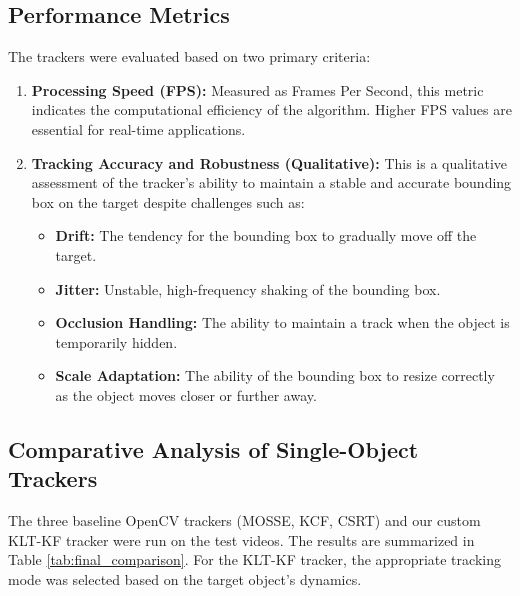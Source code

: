 \documentclass[12pt, a4paper]{article}
\begin{document}
\subsection{Performance Metrics}
The trackers were evaluated based on two primary criteria:
\begin{enumerate}
    \item \textbf{Processing Speed (FPS):} Measured as Frames Per Second, this metric indicates the computational efficiency of the algorithm. Higher FPS values are essential for real-time applications.
    \item \textbf{Tracking Accuracy and Robustness (Qualitative):} This is a qualitative assessment of the tracker's ability to maintain a stable and accurate bounding box on the target despite challenges such as:
    \begin{itemize}
        \item \textbf{Drift:} The tendency for the bounding box to gradually move off the target.
        \item \textbf{Jitter:} Unstable, high-frequency shaking of the bounding box.
        \item \textbf{Occlusion Handling:} The ability to maintain a track when the object is temporarily hidden.
        \item \textbf{Scale Adaptation:} The ability of the bounding box to resize correctly as the object moves closer or further away.
    \end{itemize}
\end{enumerate}

\subsection{Comparative Analysis of Single-Object Trackers}
The three baseline OpenCV trackers (MOSSE, KCF, CSRT) and our custom KLT-KF tracker were run on the test videos. The results are summarized in Table \ref{tab:final_comparison}. For the KLT-KF tracker, the appropriate tracking mode was selected based on the target object's dynamics.
\end{document}
